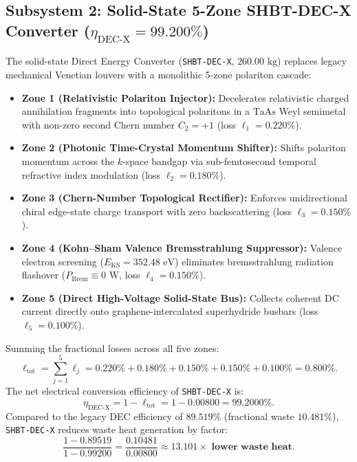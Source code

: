 \documentclass[11pt,onecolumn]{article}
\begin{document}
\subsection{\texorpdfstring{Subsystem 2: Solid-State 5-Zone SHBT-DEC-X Converter ($\eta_{\text{DEC-X}} = 99.200\%$)}{Subsystem 2: Solid-State 5-Zone SHBT-DEC-X Converter (eta\_DEC-X = 99.200\%)}}
The solid-state Direct Energy Converter (\texttt{SHBT-DEC-X}, $260.00\text{ kg}$) replaces legacy mechanical Venetian louvers with a monolithic 5-zone polariton cascade:
\begin{itemize}
    \item \textbf{Zone 1 (Relativistic Polariton Injector):} Decelerates relativistic charged annihilation fragments into topological polaritons in a $\text{TaAs}$ Weyl semimetal with non-zero second Chern number $C_2 = +1$ (loss $\ell_1 = 0.220\%$).
    \item \textbf{Zone 2 (Photonic Time-Crystal Momentum Shifter):} Shifts polariton momentum across the $k$-space bandgap via sub-femtosecond temporal refractive index modulation (loss $\ell_2 = 0.180\%$).
    \item \textbf{Zone 3 (Chern-Number Topological Rectifier):} Enforces unidirectional chiral edge-state charge transport with zero backscattering (loss $\ell_3 = 0.150\%$).
    \item \textbf{Zone 4 (Kohn--Sham Valence Bremsstrahlung Suppressor):} Valence electron screening ($E_{\text{KS}} = 352.48\text{ eV}$) eliminates bremsstrahlung radiation flashover ($P_{\text{Brem}} \equiv 0\text{ W}$, loss $\ell_4 = 0.150\%$).
    \item \textbf{Zone 5 (Direct High-Voltage Solid-State Bus):} Collects coherent DC current directly onto graphene-intercalated superhydride busbars (loss $\ell_5 = 0.100\%$).
\end{itemize}
Summing the fractional losses across all five zones:
\begin{equation}
\ell_{\text{tot}} = \sum_{j=1}^5 \ell_j = 0.220\% + 0.180\% + 0.150\% + 0.150\% + 0.100\% = 0.800\%.
\end{equation}
The net electrical conversion efficiency of \texttt{SHBT-DEC-X} is:
\begin{equation}
\eta_{\text{DEC-X}} = 1 - \ell_{\text{tot}} = 1 - 0.00800 = \mathbf{99.2000\%}.
\label{eq:decx_efficiency}
\end{equation}
Compared to the legacy DEC efficiency of $89.519\%$ (fractional waste $10.481\%$), \texttt{SHBT-DEC-X} reduces waste heat generation by factor:
\begin{equation}
\frac{1 - 0.89519}{1 - 0.99200} = \frac{0.10481}{0.00800} \approx \mathbf{13.101\times \text{ lower waste heat}}.
\end{equation}
\end{document}
